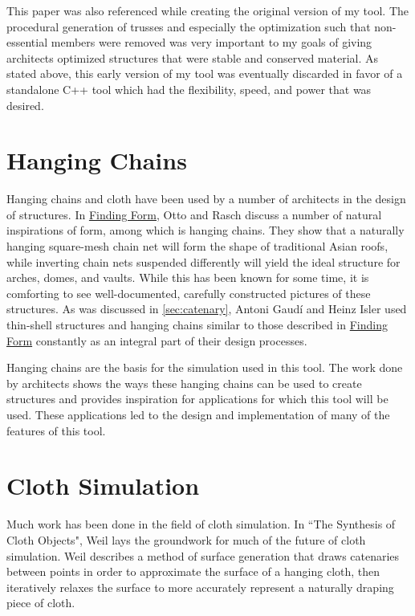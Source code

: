 \documentclass{thesis}
\begin{document}
This paper was also referenced while creating the original version of my tool.  The procedural generation
of trusses and especially the optimization such that non-essential members were removed was very important
to my goals of giving architects optimized structures that were stable and conserved material.  As stated
above, this early version of my tool was eventually discarded in favor of a standalone C++ tool which had the
flexibility, speed, and power that was desired.

\section{Hanging Chains}
Hanging chains and cloth have been used by a number of architects in the design of structures.  In
\underline{Finding Form}\cite{otto95findingform}, Otto and Rasch discuss a number of natural inspirations of form, among which
is hanging chains.  They show that a naturally hanging square-mesh chain net will form the shape of
traditional Asian roofs, while inverting chain nets suspended differently will yield the ideal structure
for arches, domes, and vaults.  While this has been known for some time, it is comforting to see
well-documented, carefully constructed pictures of these structures.  As was discussed in \ref{sec:catenary},
Antoni Gaud\'{i} and Heinz Isler used thin-shell structures and hanging chains similar to those described in
\underline{Finding Form} constantly as an integral part of their design processes. \nocite{charleson05structasarch}

Hanging chains are the basis for the simulation used in this tool.  The work done by architects shows the ways these
hanging chains can be used to create structures and provides inspiration for applications for which this tool will be
used.  These applications led to the design and implementation of many of the features of this tool.

\section{Cloth Simulation}
Much work has been done in the field of cloth simulation.  In ``The Synthesis of Cloth
Objects"\cite{weil86synthcloth}, Weil lays the groundwork for much of the future of cloth simulation.
Weil describes a method of surface generation that draws catenaries between points in order to approximate
the surface of a hanging cloth, then iteratively relaxes the surface to more accurately represent a
naturally draping piece of cloth.
\end{document}
